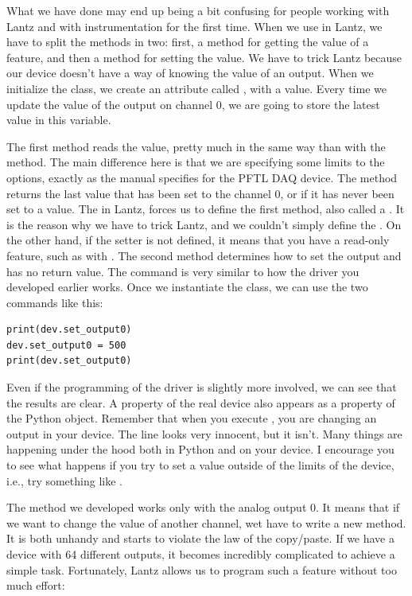 What we have done may end up being a bit confusing for people working with Lantz and with instrumentation for the first time. When we use  in Lantz, we have to split the methods in two: first, a method for getting the value of a feature, and then a method for setting the value. We have to trick Lantz because our device doesn't have a way of knowing the value of an output. When we initialize the class, we create an attribute called , with a  value. Every time we update the value of the output on channel 0, we are going to store the latest value in this variable.

The first method reads the value, pretty much in the same way than with the  method. The main difference here is that we are specifying some limits to the options, exactly as the manual specifies for the {PFTL DAQ} device. The method  returns the last value that has been set to the channel 0, or  if it has never been set to a value. The  in Lantz, forces us to define the first method, also called a . It is the reason why we have to trick Lantz, and we couldn't simply define the . On the other hand, if the setter is not defined, it means that you have a read-only feature, such as with . The second method determines how to set the output and has no return value. The command is very similar to how the driver you developed earlier works. Once we instantiate the class, we can use the two commands like this:

\begin{verbatim}
print(dev.set_output0)
dev.set_output0 = 500
print(dev.set_output0)
\end{verbatim}

Even if the programming of the driver is slightly more involved, we can see that the results are clear. A property of the real device also appears as a property of the Python object. Remember that when you execute , you are changing an output in your device. The line looks very innocent, but it isn't. Many things are happening under the hood both in Python and on your device. I encourage you to see what happens if you try to set a value outside of the limits of the device, i.e., try something like .

The method we developed works only with the analog output 0. It means that if we want to change the value of another channel, wet have to write a new method. It is both unhandy and starts to violate the law of the copy/paste. If we have a device with 64 different outputs, it becomes incredibly complicated to achieve a simple task. Fortunately, Lantz allows us to program such a feature without too much effort:

